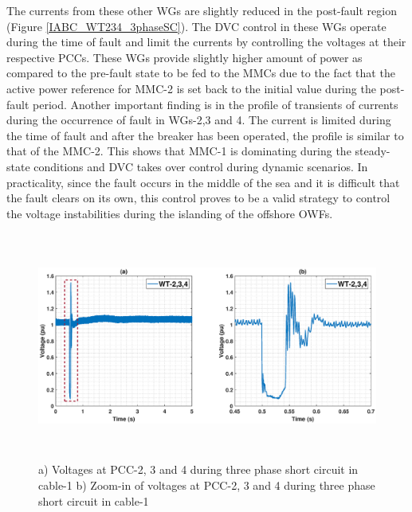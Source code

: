The currents from these other \gls{WG}s are slightly reduced in the post-fault region (Figure \ref{IABC_WT234_3phaseSC}). The \gls{DVC} control in these \gls{WG}s operate during the time of fault and limit the currents by controlling the voltages at their respective \gls{PCC}s. These \gls{WG}s provide slightly higher amount of power as compared to the pre-fault state to be fed to the \gls{MMC}s due to the fact that the active power reference for \gls{MMC}-2 is set back to the initial value during the post-fault period. Another important finding is in the profile of transients of currents during the occurrence of fault in \gls{WG}s-2,3 and 4. The current is limited during the time of fault and after the breaker has been operated, the profile is similar to that of the \gls{MMC}-2. This shows that \gls{MMC}-1 is dominating during the steady-state conditions and \gls{DVC} takes over control during dynamic scenarios. In practicality, since the fault occurs in the middle of the sea and it is difficult that the fault clears on its own, this control proves to be a valid strategy to control the voltage instabilities during the islanding of the offshore \gls{OWF}s. 

\begin{figure}[H]
\hspace*{-1.2cm}
\captionsetup{justification=centering}
    \includegraphics[height = 7.5cm,width = 19.25cm]{Diagrams/Chapter_5/VACP_WT234_3phaseSC.eps}
    \caption{a) Voltages at PCC-2, 3 and 4 during three phase short circuit in cable-1 b) Zoom-in of voltages at PCC-2, 3 and 4 during three phase short circuit in cable-1}
    \label{VACP_WT234_3phaseSC}
\end{figure}


